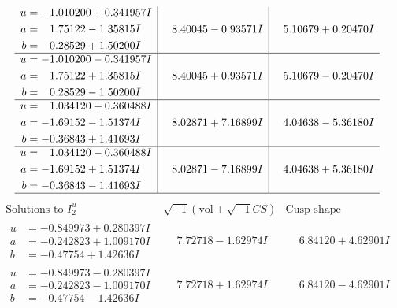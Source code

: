 \documentclass[1p]{elsarticle_modified}
\theoremstyle{definition}
\newcommand{\I}{\sqrt{-1}}
\begin{document}
$$\begin{array}{c|c|c}
\begin{aligned}
u &= -1.010200 + 0.341957 I \\
a &= \phantom{-}1.75122 - 1.35815 I \\
b &= \phantom{-}0.28529 + 1.50200 I\end{aligned}
 & \phantom{-}8.40045 - 0.93571 I & \phantom{-}5.10679 + 0.20470 I \\ \hline\begin{aligned}
u &= -1.010200 - 0.341957 I \\
a &= \phantom{-}1.75122 + 1.35815 I \\
b &= \phantom{-}0.28529 - 1.50200 I\end{aligned}
 & \phantom{-}8.40045 + 0.93571 I & \phantom{-}5.10679 - 0.20470 I \\ \hline\begin{aligned}
u &= \phantom{-}1.034120 + 0.360488 I \\
a &= -1.69152 - 1.51374 I \\
b &= -0.36843 + 1.41693 I\end{aligned}
 & \phantom{-}8.02871 + 7.16899 I & \phantom{-}4.04638 - 5.36180 I \\ \hline\begin{aligned}
u &= \phantom{-}1.034120 - 0.360488 I \\
a &= -1.69152 + 1.51374 I \\
b &= -0.36843 - 1.41693 I\end{aligned}
 & \phantom{-}8.02871 - 7.16899 I & \phantom{-}4.04638 + 5.36180 I\\
 \hline 
 \end{array}$$\newpage$$\begin{array}{c|c|c}  
\text{Solutions to }I^u_{2}& \I (\text{vol} + \sqrt{-1}CS) & \text{Cusp shape}\\
 \hline 
\begin{aligned}
u &= -0.849973 + 0.280397 I \\
a &= -0.242823 + 1.009170 I \\
b &= -0.47754 + 1.42636 I\end{aligned}
 & \phantom{-}7.72718 - 1.62974 I & \phantom{-}6.84120 + 4.62901 I \\ \hline\begin{aligned}
u &= -0.849973 - 0.280397 I \\
a &= -0.242823 - 1.009170 I \\
b &= -0.47754 - 1.42636 I\end{aligned}
 & \phantom{-}7.72718 + 1.62974 I & \phantom{-}6.84120 - 4.62901 I \\ \hline\begin{aligned}

\end{aligned}
\end{array}$$
\end{document}
